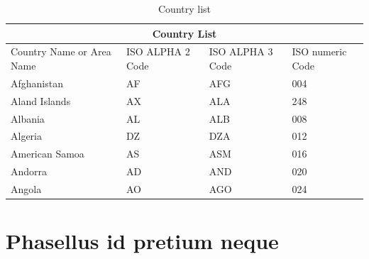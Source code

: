 \begin{table}[!ht]
	\caption{Country list}\label{t:1}
	\smallskip
	\centering

	\begin{tabular}{ |p{3cm}||p{3cm}|p{3cm}|p{3cm}|  }
		\hline
		\multicolumn{4}{|c|}{Country List} \\
		\hline
		Country Name or Area Name& ISO ALPHA 2 Code &ISO ALPHA 3 Code&ISO numeric Code\\
		\hline
		Afghanistan & AF & AFG & 004\\
		Aland Islands & AX & ALA & 248\\
		Albania & AL & ALB & 008\\
		Algeria & DZ & DZA & 012\\
		American Samoa & AS & ASM & 016\\
		Andorra & AD & AND & 020\\
		Angola & AO & AGO & 024\\
		\hline
	\end{tabular}
\end{table}


\section{Phasellus id pretium neque}
\blindtext

\blindtext
